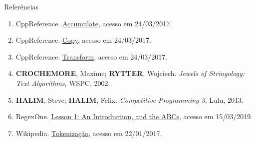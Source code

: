 \begin{frame}[fragile]{Referências}

    \begin{enumerate}
        \item CppReference. \href{http://en.cppreference.com/w/cpp/algorithm/accumulate}{Accumulate},
            acesso em 24/03/2017.

        \item CppReference. \href{http://en.cppreference.com/w/cpp/algorithm/copy}{Copy}, 
            acesso em 24/03/2017.

        \item CppReference. \href{http://en.cppreference.com/w/cpp/algorithm/transform}{Transform}, 
            acesso em 24/03/2017.

        \item \textbf{CROCHEMORE}, Maxime; \textbf{RYTTER}, Wojciech. \textit{Jewels of Stringology: Text Algorithms}, WSPC, 2002.

        \item \textbf{HALIM}, Steve; \textbf{HALIM}, Felix. \textit{Competitive Programming 3}, Lulu, 2013.

        \item RegexOne. \href{https://regexone.com/}{Lesson 1: An Introduction, and the ABCs}, acesso em 15/03/2019.

        \item Wikipedia. \href{https://en.wikipedia.org/wiki/Tokenization\_(lexical\_analysis)}{Tokenização}, acesso em 22/01/2017.

    \end{enumerate}

\end{frame}

